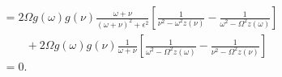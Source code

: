 \begin{equation}
\begin{split}
&= 2\Omega g(\omega)g(\nu)\frac{\omega + \nu}{(\omega + \nu)^2 + \epsilon^2}\left[\frac{1}{\nu^2 - \omega^2z(\nu)} - \frac{1}{\omega^2 - \Omega^2z(\omega)}\right]\\
&\qquad + 2\Omega g(\omega)g(\nu)\frac{1}{\omega + \nu}\left[\frac{1}{\omega^2 - \Omega^2z(\omega)} - \frac{1}{\nu^2 - \Omega^2z(\nu)}\right]\\
&= 0.
\end{split}
\end{equation}
